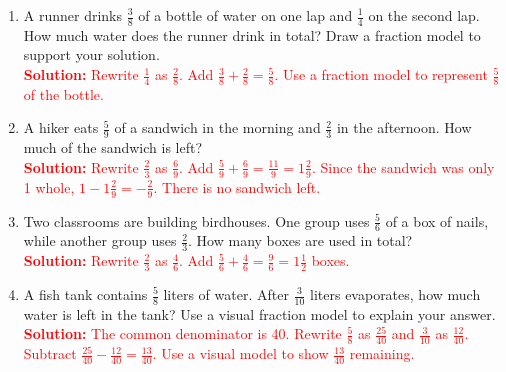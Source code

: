 \documentclass[11pt]{article}
\begin{document}
\begin{tcolorbox}[colframe=black!60, colback=white, 
coltitle=black, colbacktitle=black!15, fonttitle=\bfseries\Large, 
title=Problems, halign title=center, left=10pt, right=10pt, top=10pt, bottom=100pt]
\begin{enumerate}[start=9, itemsep=6em]

    \item A runner drinks \( \frac{3}{8} \) of a bottle of water on one lap and \( \frac{1}{4} \) on the second lap. How much water does the runner drink in total? Draw a fraction model to support your solution.\\
    \textcolor{red}{\textbf{Solution:} Rewrite \( \frac{1}{4} \) as \( \frac{2}{8} \). Add \( \frac{3}{8} + \frac{2}{8} = \frac{5}{8} \). Use a fraction model to represent \( \frac{5}{8} \) of the bottle.}

    \item A hiker eats \( \frac{5}{9} \) of a sandwich in the morning and \( \frac{2}{3} \) in the afternoon. How much of the sandwich is left?\\
    \textcolor{red}{\textbf{Solution:} Rewrite \( \frac{2}{3} \) as \( \frac{6}{9} \). Add \( \frac{5}{9} + \frac{6}{9} = \frac{11}{9} = 1 \frac{2}{9} \). Since the sandwich was only 1 whole, \( 1 - 1 \frac{2}{9} = -\frac{2}{9} \). There is no sandwich left.}

    \item Two classrooms are building birdhouses. One group uses \( \frac{5}{6} \) of a box of nails, while another group uses \( \frac{2}{3} \). How many boxes are used in total?\\
    \textcolor{red}{\textbf{Solution:} Rewrite \( \frac{2}{3} \) as \( \frac{4}{6} \). Add \( \frac{5}{6} + \frac{4}{6} = \frac{9}{6} = 1 \frac{1}{2} \) boxes.}

    \item A fish tank contains \( \frac{5}{8} \) liters of water. After \( \frac{3}{10} \) liters evaporates, how much water is left in the tank? Use a visual fraction model to explain your answer.\\
    \textcolor{red}{\textbf{Solution:} The common denominator is 40. Rewrite \( \frac{5}{8} \) as \( \frac{25}{40} \) and \( \frac{3}{10} \) as \( \frac{12}{40} \). Subtract \( \frac{25}{40} - \frac{12}{40} = \frac{13}{40} \). Use a visual model to show \( \frac{13}{40} \) remaining.}
\end{enumerate}
\end{tcolorbox}
\end{document}
